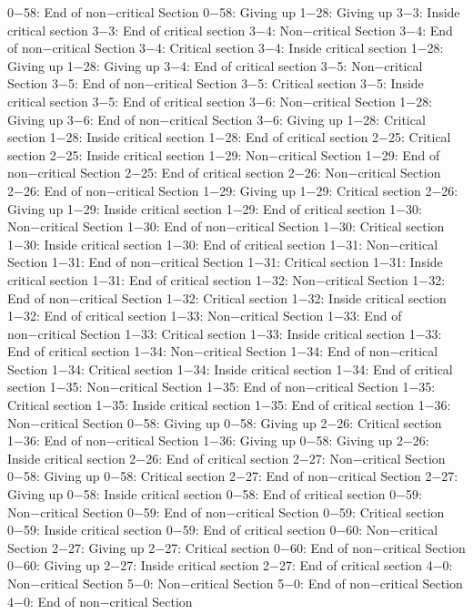 0−58: End of non−critical Section
0−58: Giving up
1−28: Giving up
3−3: Inside critical section
3−3: End of critical section
3−4: Non−critical Section
3−4: End of non−critical Section
3−4: Critical section
3−4: Inside critical section
1−28: Giving up
1−28: Giving up
3−4: End of critical section
3−5: Non−critical Section
3−5: End of non−critical Section
3−5: Critical section
3−5: Inside critical section
3−5: End of critical section
3−6: Non−critical Section
1−28: Giving up
3−6: End of non−critical Section
3−6: Giving up
1−28: Critical section
1−28: Inside critical section
1−28: End of critical section
2−25: Critical section
2−25: Inside critical section
1−29: Non−critical Section
1−29: End of non−critical Section
2−25: End of critical section
2−26: Non−critical Section
2−26: End of non−critical Section
1−29: Giving up
1−29: Critical section
2−26: Giving up
1−29: Inside critical section
1−29: End of critical section
1−30: Non−critical Section
1−30: End of non−critical Section
1−30: Critical section
1−30: Inside critical section
1−30: End of critical section
1−31: Non−critical Section
1−31: End of non−critical Section
1−31: Critical section
1−31: Inside critical section
1−31: End of critical section
1−32: Non−critical Section
1−32: End of non−critical Section
1−32: Critical section
1−32: Inside critical section
1−32: End of critical section
1−33: Non−critical Section
1−33: End of non−critical Section
1−33: Critical section
1−33: Inside critical section
1−33: End of critical section
1−34: Non−critical Section
1−34: End of non−critical Section
1−34: Critical section
1−34: Inside critical section
1−34: End of critical section
1−35: Non−critical Section
1−35: End of non−critical Section
1−35: Critical section
1−35: Inside critical section
1−35: End of critical section
1−36: Non−critical Section
0−58: Giving up
0−58: Giving up
2−26: Critical section
1−36: End of non−critical Section
1−36: Giving up
0−58: Giving up
2−26: Inside critical section
2−26: End of critical section
2−27: Non−critical Section
0−58: Giving up
0−58: Critical section
2−27: End of non−critical Section
2−27: Giving up
0−58: Inside critical section
0−58: End of critical section
0−59: Non−critical Section
0−59: End of non−critical Section
0−59: Critical section
0−59: Inside critical section
0−59: End of critical section
0−60: Non−critical Section
2−27: Giving up
2−27: Critical section
0−60: End of non−critical Section
0−60: Giving up
2−27: Inside critical section
2−27: End of critical section
4−0: Non−critical Section
5−0: Non−critical Section
5−0: End of non−critical Section
4−0: End of non−critical Section
